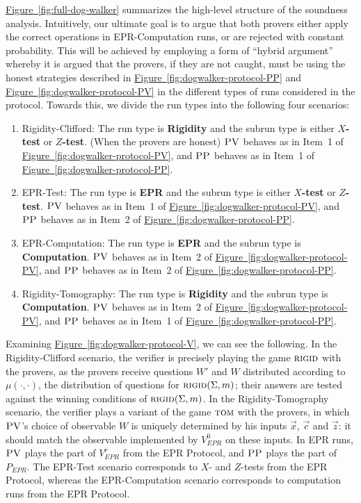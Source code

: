 \documentclass[11pt]{article}
\numberwithin{equation}{section}
\theoremstyle{definition}
\theoremstyle{plain}
\newcommand{\expref}[2]{\hyperref[#2]{#1~\ref{#2}}}
\newcommand{\rigid}{\textsc{rigid}}
\newcommand{\tom}{\textsc{tom}}
\newcommand{\pv}{\textsc{PV}}
\newcommand{\pp}{\textsc{PP}}
\begin{document}
\expref{Figure}{fig:full-dog-walker} summarizes the high-level structure of the soundness analysis. Intuitively, our ultimate goal is to argue that both provers either apply the correct operations in EPR-Computation runs, or are rejected with constant probability. This will be achieved by employing a form of ``hybrid argument'' whereby it is argued that the provers, if they are not caught, must be using the honest strategies described in \expref{Figure}{fig:dogwalker-protocol-PP} and \expref{Figure}{fig:dogwalker-protocol-PV} in the different types of runs considered in the protocol. Towards this, we divide the run types into the following four scenarios:
\begin{enumerate}
\item Rigidity-Clifford: The run type is \textbf{Rigidity} and the subrun type is either \textbf{$X$-test} or \textbf{$Z$-test}. (When the provers are honest) $\pv$ behaves as in Item~1 of \expref{Figure}{fig:dogwalker-protocol-PV}, and $\pp$ behaves as in Item~1 of \expref{Figure}{fig:dogwalker-protocol-PP}. 
\item EPR-Test: The run type is \textbf{EPR} and the subrun type is either \textbf{$X$-test} or \textbf{$Z$-test}. $\pv$ behaves as  in Item~1 of \expref{Figure}{fig:dogwalker-protocol-PV}, and $\pp$ behaves as in Item~2 of \expref{Figure}{fig:dogwalker-protocol-PP}. 
\item EPR-Computation: The run type is \textbf{EPR} and the subrun type is \textbf{Computation}. $\pv$ behaves as in Item~2 of \expref{Figure}{fig:dogwalker-protocol-PV}, and $\pp$ behaves as in Item~2 of \expref{Figure}{fig:dogwalker-protocol-PP}. 
\item Rigidity-Tomography: The run type is \textbf{Rigidity} and the subrun type is \textbf{Computation}. $\pv$ behaves as in Item~2 of \expref{Figure}{fig:dogwalker-protocol-PV}, and $\pp$ behaves as in Item~1 of \expref{Figure}{fig:dogwalker-protocol-PP}. 
\end{enumerate}
Examining \expref{Figure}{fig:dogwalker-protocol-V}, we can see the following. In the Rigidity-Clifford scenario, the verifier is precisely playing the game $\rigid$ with the provers, as the provers receive questions $W'$ and $W$ distributed according to $\mu(\cdot,\cdot)$, the distribution of questions for $\rigid(\Sigma,m)$; their answers are tested against the winning conditions of $\rigid(\Sigma,m)$. In the Rigidity-Tomography scenario, the verifier plays a variant of the game $\tom$ with the provers, in which $\pv$'s choice of observable $W$ is uniquely determined by his inputs $\vec{x}$, $\vec{c}$ and $\vec{z}$: it should match the observable implemented by $V_{EPR}^0$ on these inputs. In EPR runs, $\pv$ plays the part of $V_{EPR}^r$ from the EPR Protocol, and $\pp$ plays the part of $P_{EPR}$. The EPR-Test scenario corresponds to $X$- and $Z$-tests from the EPR Protocol, whereas the EPR-Computation scenario corresponds to computation runs from the EPR Protocol.
\end{document}
